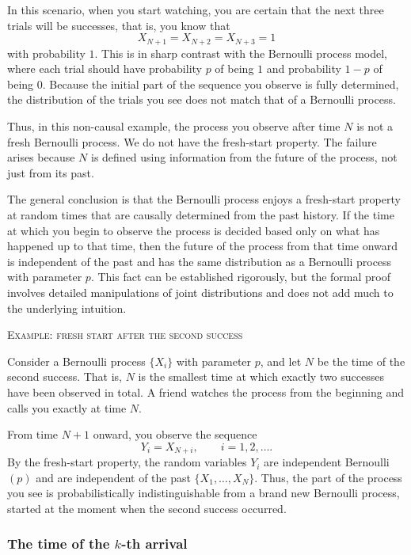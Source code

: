 In this scenario, when you start watching, you are certain that the next three trials will be successes, that is, you know that
\[
X_{N+1} = X_{N+2} = X_{N+3} = 1
\]
with probability \(1\).  
This is in sharp contrast with the Bernoulli process model, where each trial should have probability \(p\) of being \(1\) and probability \(1-p\) of being \(0\).  
Because the initial part of the sequence you observe is fully determined, the distribution of the trials you see does not match that of a Bernoulli process.  

Thus, in this non-causal example, the process you observe after time \(N\) is not a fresh Bernoulli process.  
We do not have the fresh-start property.  
The failure arises because \(N\) is defined using information from the future of the process, not just from its past.  

The general conclusion is that the Bernoulli process enjoys a fresh-start property at random times that are causally determined from the past history.  
If the time at which you begin to observe the process is decided based only on what has happened up to that time, then the future of the process from that time onward is independent of the past and has the same distribution as a Bernoulli process with parameter \(p\).  
This fact can be established rigorously, but the formal proof involves detailed manipulations of joint distributions and does not add much to the underlying intuition.  

\bigskip
\textsc{Example: fresh start after the second success}

Consider a Bernoulli process \(\{X_i\}\) with parameter \(p\), and let \(N\) be the time of the second success.  
That is, \(N\) is the smallest time at which exactly two successes have been observed in total.  
A friend watches the process from the beginning and calls you exactly at time \(N\).  

From time \(N+1\) onward, you observe the sequence
\[
Y_i = X_{N+i},
\qquad
i = 1,2,\ldots.
\]
By the fresh-start property, the random variables \(Y_i\) are independent Bernoulli\((p)\) and are independent of the past \(\{X_1,\ldots,X_N\}\).  
Thus, the part of the process you see is probabilistically indistinguishable from a brand new Bernoulli process, started at the moment when the second success occurred.

\subsubsection{The time of the \(k\)-th arrival}

